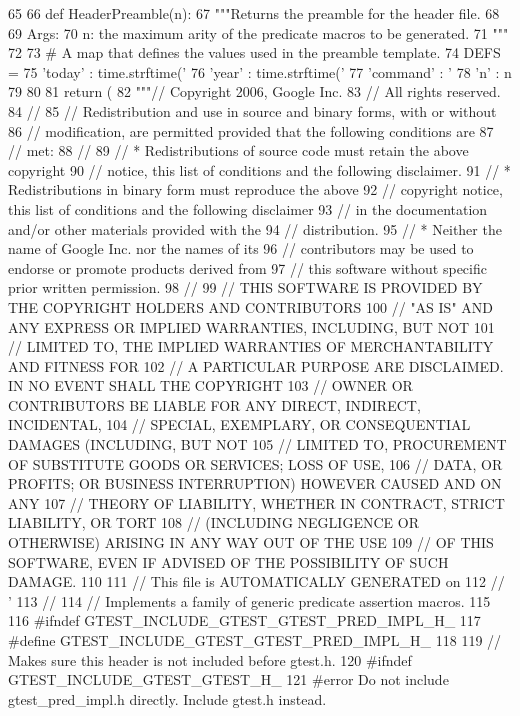 \begin{DoxyCode}
65 
66 def HeaderPreamble(n):
67   """Returns the preamble for the header file.
68 
69   Args:
70     n:  the maximum arity of the predicate macros to be generated.
71   """
72 
73   # A map that defines the values used in the preamble template.
74   DEFS = {
75     'today' : time.strftime('%
76     'year' : time.strftime('%
77     'command' : '%
78     'n' : n
79     }
80 
81   return (
82 """// Copyright 2006, Google Inc.
83 // All rights reserved.
84 //
85 // Redistribution and use in source and binary forms, with or without
86 // modification, are permitted provided that the following conditions are
87 // met:
88 //
89 //     * Redistributions of source code must retain the above copyright
90 // notice, this list of conditions and the following disclaimer.
91 //     * Redistributions in binary form must reproduce the above
92 // copyright notice, this list of conditions and the following disclaimer
93 // in the documentation and/or other materials provided with the
94 // distribution.
95 //     * Neither the name of Google Inc. nor the names of its
96 // contributors may be used to endorse or promote products derived from
97 // this software without specific prior written permission.
98 //
99 // THIS SOFTWARE IS PROVIDED BY THE COPYRIGHT HOLDERS AND CONTRIBUTORS
100 // "AS IS" AND ANY EXPRESS OR IMPLIED WARRANTIES, INCLUDING, BUT NOT
101 // LIMITED TO, THE IMPLIED WARRANTIES OF MERCHANTABILITY AND FITNESS FOR
102 // A PARTICULAR PURPOSE ARE DISCLAIMED. IN NO EVENT SHALL THE COPYRIGHT
103 // OWNER OR CONTRIBUTORS BE LIABLE FOR ANY DIRECT, INDIRECT, INCIDENTAL,
104 // SPECIAL, EXEMPLARY, OR CONSEQUENTIAL DAMAGES (INCLUDING, BUT NOT
105 // LIMITED TO, PROCUREMENT OF SUBSTITUTE GOODS OR SERVICES; LOSS OF USE,
106 // DATA, OR PROFITS; OR BUSINESS INTERRUPTION) HOWEVER CAUSED AND ON ANY
107 // THEORY OF LIABILITY, WHETHER IN CONTRACT, STRICT LIABILITY, OR TORT
108 // (INCLUDING NEGLIGENCE OR OTHERWISE) ARISING IN ANY WAY OUT OF THE USE
109 // OF THIS SOFTWARE, EVEN IF ADVISED OF THE POSSIBILITY OF SUCH DAMAGE.
110 
111 // This file is AUTOMATICALLY GENERATED on %
112 // '%
113 //
114 // Implements a family of generic predicate assertion macros.
115 
116 #ifndef GTEST_INCLUDE_GTEST_GTEST_PRED_IMPL_H_
117 #define GTEST_INCLUDE_GTEST_GTEST_PRED_IMPL_H_
118 
119 // Makes sure this header is not included before gtest.h.
120 #ifndef GTEST_INCLUDE_GTEST_GTEST_H_
121 #error Do not include gtest_pred_impl.h directly.  Include gtest.h instead.

\end{DoxyCode}
